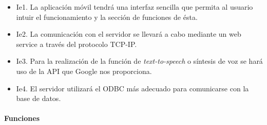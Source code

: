 \begin{itemize}
\item	Ie1. La aplicación móvil tendrá una interfaz sencilla que permita al usuario intuir el funcionamiento y la sección de funciones de ésta.
\item	Ie2. La comunicación con el servidor se llevará a cabo mediante un web service a través del protocolo TCP-IP.
\item	Ie3. Para la realización de la función de \textit{text-to-speech} o síntesis de voz se hará uso de la API que Google nos proporciona.
\item	Ie4. El servidor utilizará el ODBC más adecuado  para comunicarse con la base de datos.
\end{itemize}

\paragraph{Funciones}
